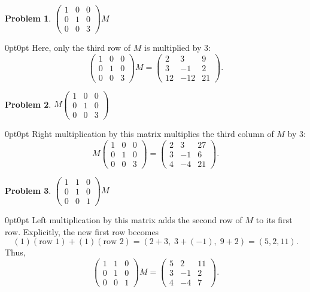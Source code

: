 \documentclass[12pt]{article}
\newenvironment{answer}
    {\begin{adjustwidth}{0pt}{0pt}}
    {\end{adjustwidth}}
\newtheorem{problem}{Problem}
\theoremstyle{remark}  %
\begin{document}
\begin{problem}
$
\begin{pmatrix}
1 & 0 & 0 \\
0 & 1 & 0 \\
0 & 0 & 3
\end{pmatrix} M
$
\end{problem}
\begin{answer}
Here, only the third row of \(M\) is multiplied by 3:
\[
\begin{pmatrix}
1 & 0 & 0 \\
0 & 1 & 0 \\
0 & 0 & 3
\end{pmatrix} M
=
\begin{pmatrix}
2 & 3 & 9 \\
3 & -1 & 2 \\
12 & -12 & 21
\end{pmatrix}.
\]
\end{answer}

\begin{problem}
$
M
\begin{pmatrix}
1 & 0 & 0 \\
0 & 1 & 0 \\
0 & 0 & 3
\end{pmatrix}
$
\end{problem}
\begin{answer}
Right multiplication by this matrix multiplies the third column of \(M\) by 3:
\[
M \begin{pmatrix}
1 & 0 & 0 \\
0 & 1 & 0 \\
0 & 0 & 3
\end{pmatrix}
=
\begin{pmatrix}
2 & 3 & 27 \\
3 & -1 & 6 \\
4 & -4 & 21
\end{pmatrix}.
\]
\end{answer}

\begin{problem}
$
\begin{pmatrix}
1 & 1 & 0 \\
0 & 1 & 0 \\
0 & 0 & 1
\end{pmatrix} M
$
\end{problem}
\begin{answer}
Left multiplication by this matrix adds the second row of \(M\) to its first row. Explicitly, the new first row becomes
\[
(1)(\text{row 1})+(1)(\text{row 2}) = (2+3,\; 3+(-1),\; 9+2)=(5,2,11).
\]
Thus,
\[
\begin{pmatrix}
1 & 1 & 0 \\
0 & 1 & 0 \\
0 & 0 & 1
\end{pmatrix} M
=
\begin{pmatrix}
5 & 2 & 11 \\
3 & -1 & 2 \\
4 & -4 & 7
\end{pmatrix}.
\]
\end{answer}
\end{document}
